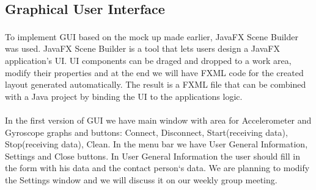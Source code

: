 \documentclass[conference,12pt]{IEEETran}
\begin{document}
\subsection{Graphical User Interface} 
To implement GUI based on the mock up made earlier, JavaFX Scene Builder\textsuperscript{\cite{JavaFX}} was used. JavaFX Scene Builder is a tool that lets users design a JavaFX application's UI. UI components can be draged and dropped to a work area, modify their properties and at the end we will have FXML code for the created layout generated automatically. The result is a FXML file that can be combined with a Java project by binding the UI to the applications logic. \\\\
In the first version of GUI we have main window with area for Accelerometer and Gyroscope graphs and buttons: Connect, Disconnect, Start(receiving data), Stop(receiving data), Clean. In the menu bar we have User General Information, Settings and Close buttons. In User General Information the user should fill in the form with his data and the contact person`s data. We are planning to modify the Settings window and we will discuss it on our weekly group meeting.


\nocite{*}
\printbibliography
\end{document}
